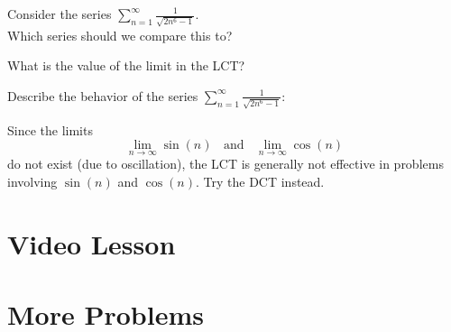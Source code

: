 \documentclass{ximera}
\begin{document}
\begin{problem}
Consider the series $\displaystyle{\sum_{n=1}^\infty \frac{1}{\sqrt{2n^6 - 1}}}$.\\
Which series should we compare this to?

\begin{multipleChoice}
\end{multipleChoice}

What is the value of the limit in the LCT?
\begin{multipleChoice}
\end{multipleChoice}

Describe the behavior of the series $\sum_{n=1}^\infty \frac{1}{\sqrt{2n^6 - 1}}:$
\begin{multipleChoice}
\end{multipleChoice}

\end{problem}


\begin{remark}
Since the limits
\[
\lim_{n \to \infty} \sin(n) \;\; \text{ and } \;\; \lim_{n \to \infty} \cos(n)
\]
do not exist (due to oscillation), the LCT is generally not effective in problems involving $\sin(n)$ and $\cos(n)$. Try the DCT instead.
\end{remark}

\section{Video Lesson}

\begin{center}
\begin{foldable}
\end{foldable}
\end{center}


\section{More Problems}
\end{document}
